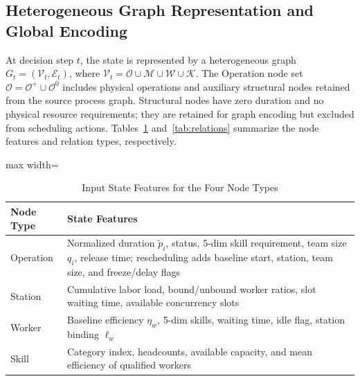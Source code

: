 \documentclass[journal,10pt]{IEEEtran}
\renewcommand{\arraystretch}{1.04}
\begin{document}
\subsection{Heterogeneous Graph Representation and Global Encoding}\label{sec:encoder}

At decision step $t$, the state is represented by a heterogeneous graph $G_t=(\mathcal{V}_t,\mathcal{E}_t)$, where $\mathcal{V}_t=\mathcal{O}\cup\mathcal{M}\cup\mathcal{W}\cup\mathcal{K}$. The Operation node set $\mathcal{O}=\mathcal{O}^+\cup\mathcal{O}^0$ includes physical operations and auxiliary structural nodes retained from the source process graph. Structural nodes have zero duration and no physical resource requirements; they are retained for graph encoding but excluded from scheduling actions. Tables~\ref{tab:node_features} and~\ref{tab:relations} summarize the node features and relation types, respectively.

\begin{table}[!t]
\centering
\caption{Input State Features for the Four Node Types}
\label{tab:node_features}
\setlength{\tabcolsep}{3pt}
\renewcommand{\arraystretch}{0.98}
\begin{adjustbox}{max width=\columnwidth}
\begin{tabular}{@{}lp{6.8cm}@{}}
\toprule
\textbf{Node Type} & \textbf{State Features} \\
\midrule
Operation & Normalized duration $\widetilde p_i$, status, 5-dim skill requirement, team size $q_i$, release time; rescheduling adds baseline start, station, team size, and freeze/delay flags \\
Station & Cumulative labor load, bound/unbound worker ratios, slot waiting time, available concurrency slots \\
Worker & Baseline efficiency $\eta_w$, 5-dim skills, waiting time, idle flag, station binding $\ell_w$ \\
Skill & Category index, headcounts, available capacity, and mean efficiency of qualified workers \\
\bottomrule
\end{tabular}
\end{adjustbox}
\vspace{2pt}
\par{}\par
\end{table}
\end{document}
